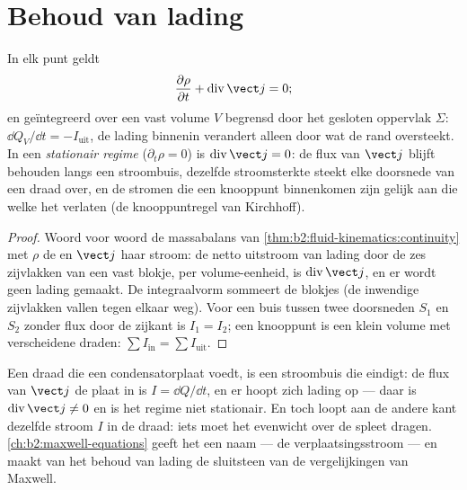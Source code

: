 \section{Behoud van lading}

\begin{theorem}\label{thm:b2:charges-currents-conduction:conservation}
In elk punt geldt
\[
\frac{\partial\rho}{\partial t} + \operatorname{div}\vect j = 0 ;
\]
en geïntegreerd over een vast volume $V$ begrensd door het gesloten
oppervlak $\Sigma$: $\dd Q_V/\dd t = -I_{\text{uit}}$, de lading binnenin
verandert alleen door wat de rand oversteekt. In een \emph{stationair
regime} ($\partial_t\rho = 0$) is $\operatorname{div}\vect j = 0$: de flux
van $\vect j$ blijft behouden langs een stroombuis, dezelfde stroomsterkte
steekt elke doorsnede van een draad over, en de stromen die een knooppunt
binnenkomen zijn gelijk aan die welke het verlaten (de knooppuntregel van
Kirchhoff).
\end{theorem}

\begin{proof}
Woord voor woord de massabalans van
\cref{thm:b2:fluid-kinematics:continuity} met $\rho$ de  en
$\vect j$ haar stroom: de netto uitstroom van lading door de zes zijvlakken
van een vast blokje, per volume-eenheid, is $\operatorname{div}\vect j$, en
er wordt geen lading gemaakt. De integraalvorm sommeert de blokjes (de
inwendige zijvlakken vallen tegen elkaar weg). Voor een buis tussen twee
doorsneden $S_1$ en $S_2$ zonder flux door de zijkant is $I_1 = I_2$; een
knooppunt is een klein volume met verscheidene draden:
$\sum I_{\text{in}} = \sum I_{\text{uit}}$.
\end{proof}

\begin{remark}\label{rem:b2:charges-currents-conduction:capacitor}
Een draad die een condensatorplaat voedt, is een stroombuis die eindigt: de
flux van $\vect j$ de plaat in is $I = \dd Q/\dd t$, en er hoopt zich lading
op --- daar is $\operatorname{div}\vect j \ne 0$ en is het regime niet
stationair. En toch loopt aan de andere kant dezelfde stroom $I$ in de
draad: iets moet het evenwicht over de spleet dragen.
\cref{ch:b2:maxwell-equations} geeft het een naam --- de verplaatsingsstroom
--- en maakt van het behoud van lading de sluitsteen van de vergelijkingen
van Maxwell.
\end{remark}

